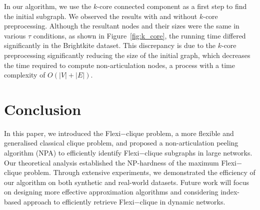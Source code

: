 \documentclass[sigconf]{acmart}
\newcommand{\spara}[1]{\smallskip\noindent{\bf #1}}
\newcommand{\flexi}{\textsf{Flexi$-$clique}}
\newcommand{\NPA}{\textsf{NPA}}
\begin{document}
\spara{\textbf{EQ4. Effect on $k$-core}.} In our algorithm, we use the $k$-core connected component as a first step to find the initial subgraph. We observed the results with and without $k$-core preprocessing. Although the resultant nodes and their sizes were the same in various $\tau$ conditions, as shown in Figure~\ref{fig:k_core}, the running time differed significantly in the Brightkite dataset. This discrepancy is due to the $k$-core preprocessing significantly reducing the size of the initial graph, which decreases the time required to compute non-articulation nodes, a process with a time complexity of $O(|V|+|E|)$.







\section{Conclusion}\label{sec:conclusion}
In this paper, we introduced the {\flexi} problem, a more flexible and generalised classical clique problem, and proposed a non-articulation peeling algorithm (\NPA) to efficiently identify {\flexi} subgraphs in large networks. Our theoretical analysis established the NP-hardness of the maximum {\flexi} problem. Through extensive experiments, we demonstrated the efficiency of our algorithm on both synthetic and real-world datasets. Future work will focus on designing more effective approximation algorithms and considering index-based approach to efficiently retrieve {\flexi} in dynamic networks. 



\end{document}
